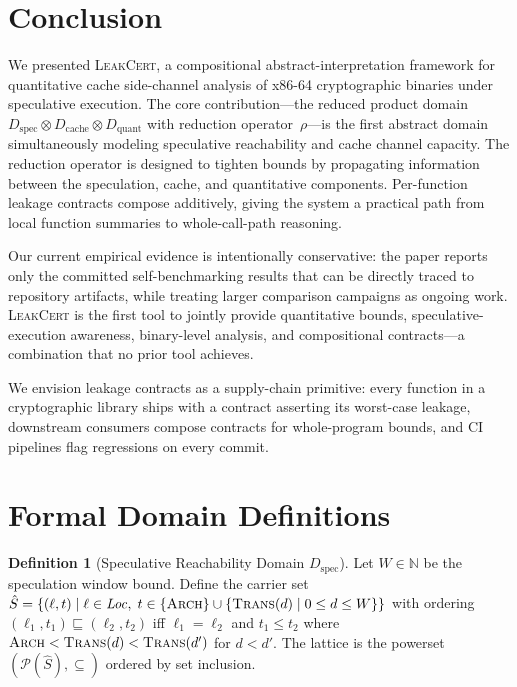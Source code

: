 \documentclass{article}
\theoremstyle{definition}
\newtheorem{definition}[theorem]{Definition}
\theoremstyle{remark}
\newcommand{\Dspec}{D_{\text{spec}}}
\newcommand{\Dcache}{D_{\text{cache}}}
\newcommand{\Dquant}{D_{\text{quant}}}
\begin{document}
\section{Conclusion}
\label{sec:conclusion}

We presented \textsc{LeakCert}, a compositional abstract-interpretation
framework for quantitative cache side-channel analysis of x86-64 cryptographic
binaries under speculative execution.  The core contribution---the reduced
product domain $\Dspec \otimes \Dcache \otimes \Dquant$ with reduction
operator~$\rho$---is the first abstract domain simultaneously modeling
speculative reachability and cache channel capacity. The reduction operator is
designed to tighten bounds by propagating information between the speculation,
cache, and quantitative components. Per-function leakage contracts compose
additively, giving the system a practical path from local function summaries to
whole-call-path reasoning.

Our current empirical evidence is intentionally conservative: the paper reports
only the committed self-benchmarking results that can be directly traced to
repository artifacts, while treating larger comparison campaigns as ongoing
work.
\textsc{LeakCert} is the first tool to jointly
provide quantitative bounds, speculative-execution awareness, binary-level
analysis, and compositional contracts---a combination that no prior tool
achieves.

We envision leakage contracts as a supply-chain primitive: every function in a
cryptographic library ships with a contract asserting its worst-case leakage,
downstream consumers compose contracts for whole-program bounds, and CI
pipelines flag regressions on every commit.

\appendix

\section{Formal Domain Definitions}
\label{app:domains}

\begin{definition}[Speculative Reachability Domain $\Dspec$]
Let $W \in \mathbb{N}$ be the speculation window bound.  Define the carrier set
$\hat{S} = \{ (\ell, t) \mid \ell \in \mathit{Loc},\; t \in \{\textsc{Arch}\} \cup \{\textsc{Trans}(d) \mid 0 \le d \le W\} \}$
with ordering $(\ell_1, t_1) \sqsubseteq (\ell_2, t_2)$ iff $\ell_1 = \ell_2$ and
$t_1 \le t_2$ where $\textsc{Arch} < \textsc{Trans}(d) < \textsc{Trans}(d')$ for $d < d'$.
The lattice is the powerset $(\mathcal{P}(\hat{S}), \subseteq)$ ordered by set inclusion.
\end{definition}
\end{document}
